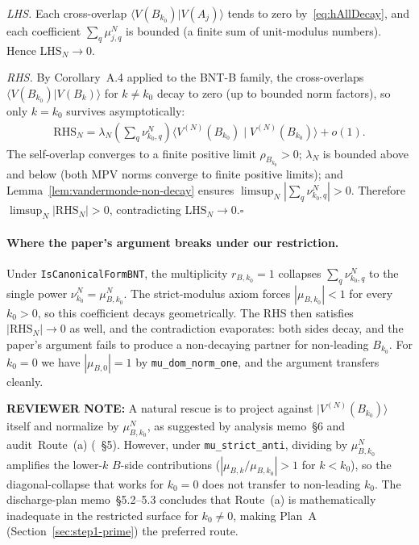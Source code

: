 \documentclass{article}
\newcommand{\leanid}[1]{\texttt{#1}}
\theoremstyle{plain}
\begin{document}
\emph{LHS.} Each cross-overlap $\langle V(B_{k_0})|V(A_j)\rangle$ tends
to zero by~\eqref{eq:hAllDecay}, and each coefficient $\sum_q \mu_{j,q}^N$
is bounded (a finite sum of unit-modulus numbers). Hence
$\mathrm{LHS}_N \to 0$.

\emph{RHS.} By Corollary~A.4 applied to the BNT-B family, the
cross-overlaps $\langle V(B_{k_0})|V(B_k)\rangle$ for $k \neq k_0$ decay
to zero (up to bounded norm factors), so only $k = k_0$ survives
asymptotically:
\begin{align}
    \mathrm{RHS}_N
    = \lambda_N \left(\sum_q \nu_{k_0,q}^N\right)
    \langle V^{(N)}(B_{k_0}) \mid V^{(N)}(B_{k_0}) \rangle + o(1).
\end{align}
The self-overlap converges to a finite positive limit $\rho_{B_{k_0}} >
    0$; $\lambda_N$ is bounded above and below (both MPV norms converge to
finite positive limits); and Lemma~\ref{lem:vandermonde-non-decay}
ensures $\limsup_N |\sum_q \nu_{k_0,q}^N| > 0$. Therefore
$\limsup_N |\mathrm{RHS}_N| > 0$, contradicting
$\mathrm{LHS}_N \to 0$.\hfill$\square$

\paragraph{Where the paper's argument breaks under our restriction.}
Under \leanid{IsCanonicalFormBNT}, the multiplicity $r_{B,k_0} = 1$
collapses $\sum_q \nu_{k_0,q}^N$ to the single power
$\nu_{k_0}^N = \mu_{B,k_0}^N$. The strict-modulus axiom forces
$|\mu_{B,k_0}| < 1$ for every $k_0 > 0$, so this coefficient decays
geometrically. The RHS then satisfies $|\mathrm{RHS}_N| \to 0$ as well,
and the contradiction evaporates: both sides decay, and the paper's
argument fails to produce a non-decaying partner for non-leading
$B_{k_0}$. For $k_0 = 0$ we have $|\mu_{B,0}| = 1$ by
\leanid{mu\_dom\_norm\_one}, and the argument transfers cleanly.

\textbf{REVIEWER NOTE:} A natural rescue is to project against
$|V^{(N)}(B_{k_0})\rangle$ itself and normalize by $\mu_{B,k_0}^N$,
as suggested by analysis memo~\S6 and audit~Route~(a)
(~\S5).
However, under \leanid{mu\_strict\_anti}, dividing by $\mu_{B,k_0}^N$
amplifies the lower-$k$ $B$-side contributions
($|\mu_{B,k}/\mu_{B,k_0}| > 1$ for $k < k_0$), so the diagonal-collapse
that works for $k_0 = 0$ does not transfer to non-leading $k_0$. The
discharge-plan memo~\S5.2--5.3 concludes that Route~(a) is
mathematically inadequate in the restricted surface for $k_0 \neq 0$,
making Plan~A (Section~\ref{sec:step1-prime}) the preferred route.
\end{document}
